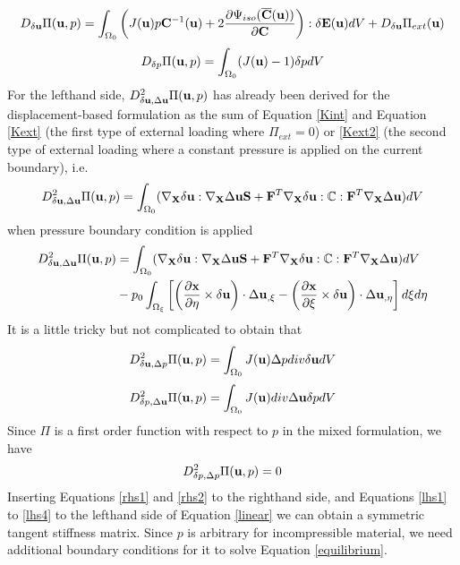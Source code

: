 \begin{equation}\label{rhs1}
D_{\delta\bold{u}}\Pi(\bold{u}, p) = \int_{\Omega_0}\left( J(\bold{u})p\bold{C}^{-1}(\bold{u}) + 
2\frac{\partial{\Psi_{iso}(\overline{\bold{C}}(\bold{u}))}}{\partial{\bold{C}}}  \right) : \delta\bold{E}(\bold{u}) dV + D_{\delta\bold{u}}\Pi_{ext}(\bold{u})
\end{equation}
\begin{equation}\label{rhs2}
D_{\delta{p}}\Pi(\bold{u}, p) = \int_{\Omega_0} (J(\bold{u}) - 1 )\delta{p} dV
\end{equation}
For the lefthand side, $D_{\delta\bold{u}, \Delta\bold{u}}^2 \Pi(\bold{u}, p)$ has already been derived for the displacement-based formulation as the sum of Equation \ref{Kint} and Equation \ref{Kext} (the first type of external loading where $\Pi_{ext} = 0$) or \ref{Kext2} (the second type of external loading where a constant pressure is applied on the current boundary), i.e.
\begin{equation} \label{lhs0}
D_{\delta\bold{u}, \Delta\bold{u}}^2 \Pi(\bold{u}, p) =  \int_{\Omega_0}(\nabla_{\bold{X}}\delta\bold{u} : \nabla_{\bold{X}}\Delta\bold{u}\bold{S} + \bold{F}^T\nabla_{\bold{X}}\delta{\bold{u}} : \mathbb{C} : \bold{F}^T \nabla_{\bold{X}}\Delta\bold{u})dV  \end{equation}
when pressure boundary condition is applied
\begin{equation} \label{lhs1}
\begin{split}
D_{\delta\bold{u}, \Delta\bold{u}}^2 \Pi(\bold{u}, p) 
&= \int_{\Omega_0}(\nabla_{\bold{X}}\delta\bold{u} : \nabla_{\bold{X}}\Delta\bold{u}\bold{S} + \bold{F}^T\nabla_{\bold{X}}\delta{\bold{u}} : \mathbb{C} : \bold{F}^T \nabla_{\bold{X}}\Delta\bold{u})dV  \\
&-  p_0\int_{\Omega_{\xi}}  \left[\left(\frac{\partial{\bold{x}}}{\partial{\eta}} \times \delta\bold{u}\right) \cdot\Delta{\bold{u}}_{,\xi} - 
\left(\frac{\partial{\bold{x}}}{\partial{\xi}} \times \delta\bold{u}\right) \cdot\Delta{\bold{u}}_{,\eta} \right]d\xi{d\eta}
\end{split}
\end{equation}
It is a little tricky but not complicated to obtain that
\begin{equation} \label{lhs2}
D_{\delta\bold{u}, \Delta{p}}^2 \Pi(\bold{u}, p) = \int_{\Omega_0} J(\bold{u})\Delta{p}div\delta{\bold{u}}dV
\end{equation}
\begin{equation} \label{lhs3}
D_{\delta{p}, \Delta\bold{u}}^2 \Pi(\bold{u}, p) = \int_{\Omega_0} J(\bold{u})div\Delta{\bold{u}}\delta{p}dV
\end{equation}
Since $\Pi$ is a first order function with respect to $p$ in the mixed formulation, we have
\begin{equation} \label{lhs4}
D_{\delta{p}, \Delta{p}}^2 \Pi(\bold{u}, p) = 0
\end{equation}
Inserting Equations \ref{rhs1} and \ref{rhs2} to the righthand side, and Equations \ref{lhs1} to \ref{lhs4} to the lefthand side of Equation \ref{linear} we can obtain a symmetric tangent stiffness matrix. Since $p$ is arbitrary for incompressible material, we need additional boundary conditions for it to solve Equation \ref{equilibrium}.

